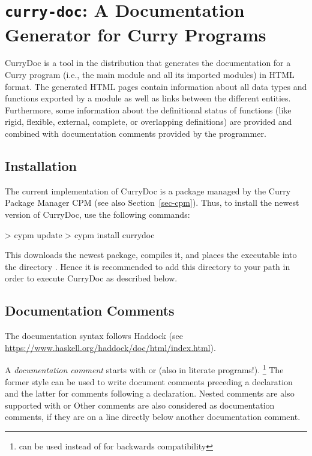 \section{\texttt{curry-doc}: A Documentation Generator for Curry Programs}

CurryDoc%
is a tool in the \CYS distribution that generates
the documentation for a Curry program (i.e., the main module
and all its imported modules) in HTML format.
The generated HTML pages contain information about
all data types and functions exported by a module as well
as links between the different entities.
Furthermore, some information about the definitional status
of functions (like rigid, flexible, external, complete, or
overlapping definitions) are provided and combined with
documentation comments provided by the programmer.

\subsection{Installation}

The current implementation of CurryDoc is a package
managed by the Curry Package Manager CPM
(see also Section~\ref{sec-cpm}).
Thus, to install the newest version of CurryDoc, use the following commands:
%
\begin{curry}
> cypm update
> cypm install currydoc
\end{curry}
%
This downloads the newest package, compiles it, and places
the executable  into the directory .
Hence it is recommended to add this directory to your path
in order to execute CurryDoc as described below.

\subsection{Documentation Comments}

The documentation syntax follows Haddock
(see \url{https://www.haskell.org/haddock/doc/html/index.html}).

A \emph{documentation comment}%
starts with \ccode{-{}- | } or \ccode{-{}- \textasciicircum }
(also in literate programs!).
\footnote{\ccode{-{}-{}- } can be used instead of
          \ccode{-{}- | } for backwards compatibility}
The former style can be used to write document comments preceding a declaration
and the latter for comments following a declaration.
Nested comments are also supported with  \ccode{\{- | }
or \ccode{\{- \textasciicircum}
Other comments are also considered as documentation comments, if they are
on a line directly below another documentation comment.

